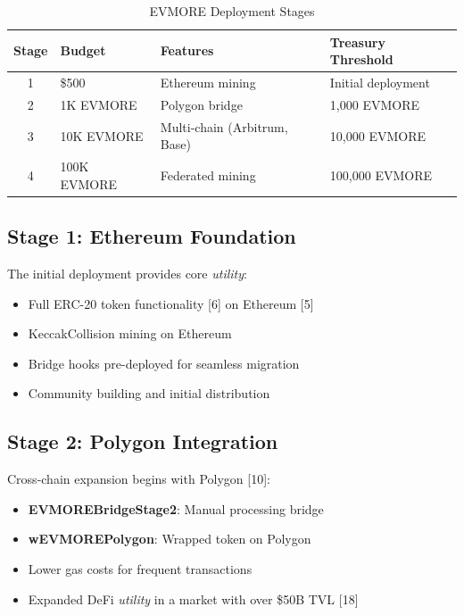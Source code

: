 \documentclass[11pt,a4paper]{article}
\begin{document}
\begin{table}[h]
\centering
\begin{tabular}{@{}clll@{}}
\toprule
\textbf{Stage} & \textbf{Budget} & \textbf{Features} & \textbf{Treasury Threshold} \\
\midrule
1 & \$500 & Ethereum mining & Initial deployment \\
2 & 1K EVMORE & Polygon bridge & 1,000 EVMORE \\
3 & 10K EVMORE & Multi-chain (Arbitrum, Base) & 10,000 EVMORE \\
4 & 100K EVMORE & Federated mining & 100,000 EVMORE \\
\bottomrule
\end{tabular}
\caption{EVMORE Deployment Stages}
\end{table}

\subsection{Stage 1: Ethereum Foundation}

The initial deployment provides core \textit{utility}:

\begin{itemize}
    \item Full ERC-20 token functionality [6] on Ethereum [5]
    \item KeccakCollision mining on Ethereum
    \item Bridge hooks pre-deployed for seamless migration
    \item Community building and initial distribution
\end{itemize}

\subsection{Stage 2: Polygon Integration}

Cross-chain expansion begins with Polygon [10]:

\begin{itemize}
    \item \textbf{EVMOREBridgeStage2}: Manual processing bridge
    \item \textbf{wEVMOREPolygon}: Wrapped token on Polygon
    \item Lower gas costs for frequent transactions
    \item Expanded DeFi \textit{utility} in a market with over \$50B TVL [18]
\end{itemize}
\end{document}
